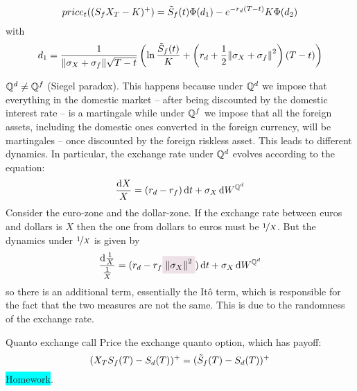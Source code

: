 \begin{equation}
    price_t((S_f X_T-K)^+) = \Tilde{S}_f(t)\Phi(d_1)-e^{-r_d(T-t)}K\Phi(d_2)
\end{equation}
with
\begin{equation}
    d_1 = \frac{1}{\norm{\sigma_X+\sigma_f}\sqrt{T-t}}\left(\ln\frac{\Tilde{S}_f(t)}{K}+\left(r_d+\frac{1}{2}\norm{\sigma_X+\sigma_f}^2\right)(T-t)\right)
\end{equation}
\begin{remark}
    $\mathbb{Q}^d \ne \mathbb{Q}^f$ (Siegel paradox). This happens because under $\mathbb{Q}^d$ we impose that everything in the domestic market -- after being discounted by the domestic interest rate -- is a martingale while under $\mathbb{Q}^f$ we impose that all the foreign assets, including the domestic ones converted in the foreign currency, will be martingales -- once discounted by the foreign riskless asset. This leads to different dynamics. In particular, the exchange rate under $\mathbb{Q}^d$ evolves according to the equation:
    \begin{equation}
       \frac{\dd X}{X} = (r_d-r_f)\,\dd t + \sigma_X\,\dd W^{\mathbb{Q}^d}
    \end{equation}
    Consider the euro-zone and the dollar-zone. If the exchange rate between euros and dollars is $X$ then the one from dollars to euros must be $\nicefrac{1}{X}$. But the dynamics under $\nicefrac{1}{X}$ is given by
    \begin{equation}
        \frac{\dd\frac{1}{X}}{\frac{1}{X}} = (r_d-r_f\hlc{mypink}{\norm{\sigma_X}^2})\,\dd t + \sigma_X\,\dd W^{\Qmeas^d}
    \end{equation}
    so there is an additional term, essentially the Itô term, which is responsible for the fact that the two measures are not the same. This is due to the randomness of the exchange rate.
\end{remark}
\begin{example}{Quanto exchange call}{}{}
    Price the exchange quanto option, which has payoff:
    \begin{equation*}
        (X_TS_f(T)-S_d(T))^+ = (\Tilde{S}_f(T)-S_d(T))^+
    \end{equation*}
    \colorbox{cyan}{Homework}.
\end{example}
